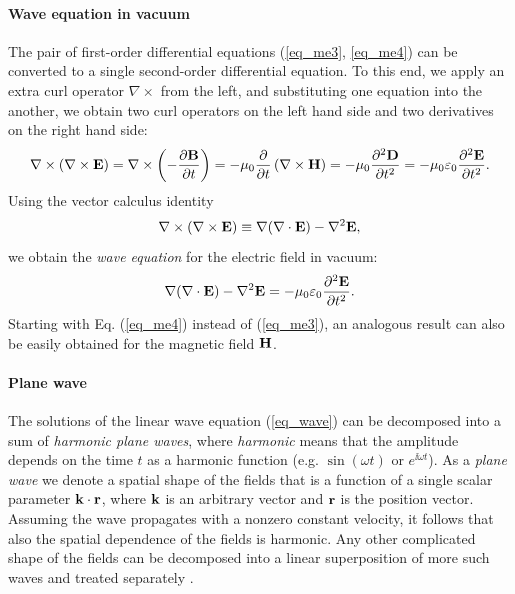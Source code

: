 \paragraph{Wave equation in vacuum} %
The pair of first-order differential equations (\ref{eq_me3}, \ref{eq_me4}) can be converted to a single second-order differential equation. To this end, we apply an extra curl operator $\nabla\times$ from the left, and substituting one equation into the another, we obtain two curl operators on the left hand side and two derivatives on the right hand side: 
\label{starttext}
\begin{equation} \nabla\times (\nabla\times \mathbf{E}) = \nabla\times \left(- \frac{\partial \mathbf{B}} {\partial t}\right) = -\mu_0 \frac{\partial}{\partial t} \left(\nabla\times \mathbf{H}\right) 
= -\mu_0 \frac{\partial^{2} \mathbf{D}}{\partial t^{2}} = -\mu_0 \varepsilon_0 \frac{\partial^{2} \mathbf{E}}{\partial t^{2}}.  \label{eq_elim}\end{equation}
Using the vector calculus identity
\begin{equation} \nabla\times (\nabla\times \mathbf{E}) \equiv \nabla (\nabla \cdot \mathbf{E}) - \nabla^2 \mathbf{E}, \label{eq_rotrot}\end{equation}
we obtain the \textit{wave equation} for the electric field in vacuum: 
\begin{equation}  \nabla (\nabla \cdot \mathbf{E}) - \nabla^2 \mathbf{E} = -\mu_0 \varepsilon_0 \frac{\partial^{2} \mathbf{E}}{\partial t^{2}}.  \label{eq_wave}\end{equation}
Starting with Eq. (\ref{eq_me4}) instead of (\ref{eq_me3}), an analogous result can also be easily obtained for the magnetic field $\mathbf{H}$.

\paragraph{Plane wave} %
The solutions of the linear wave equation (\ref{eq_wave}) can be decomposed into a sum of \textit{harmonic plane waves}, where \textit{harmonic} means that the amplitude depends on the time $t$ as a harmonic function (e.g. $\sin(\omega t)$ or $e^{\ii \omega t}$). As a \textit{plane wave} we denote a spatial shape of the fields that is a function of a single scalar parameter ${\mathbf{k}}\cdot{\mathbf{r}}$, where ${\mathbf{k}}$ is an arbitrary vector \textit{} and ${\mathbf{r}}$ is the position vector. Assuming the wave propagates with a nonzero constant velocity, it follows that also the spatial dependence of the fields is harmonic. Any other complicated shape of the fields can be decomposed into a linear superposition of more such waves and treated separately \cite{jackson1962book}. 

